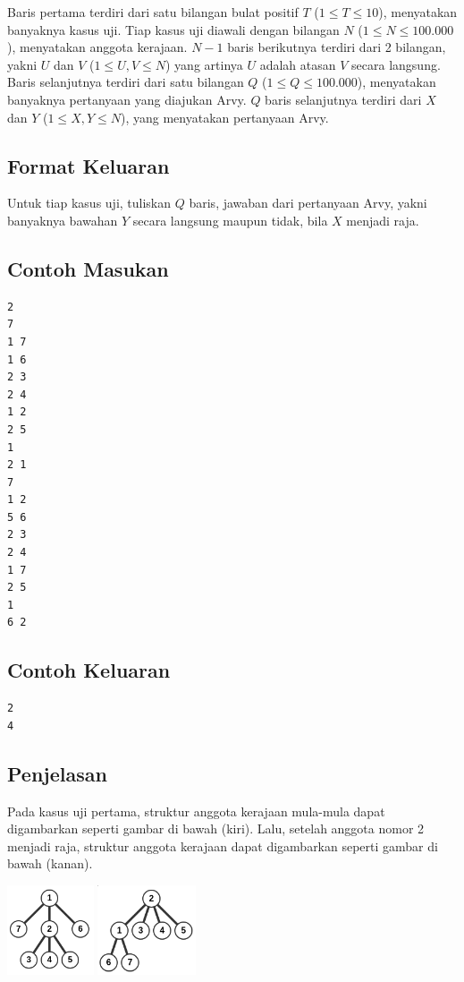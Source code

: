 \documentclass{article}
\begin{document}
Baris pertama terdiri dari satu bilangan bulat positif $T$ ($1 \leq T \leq 10$), menyatakan banyaknya kasus uji.
Tiap kasus uji diawali dengan bilangan $N$ ($1 \leq N \leq 100.000$), menyatakan anggota kerajaan.
$N - 1$ baris berikutnya terdiri dari 2 bilangan, yakni $U$ dan $V$ ($1 \leq U, V \leq N$) yang artinya $U$ adalah atasan $V$ secara langsung.
Baris selanjutnya terdiri dari satu bilangan $Q$ ($1 \leq Q \leq 100.000$), menyatakan banyaknya pertanyaan yang diajukan Arvy.
$Q$ baris selanjutnya terdiri dari $X$ dan $Y$ ($1 \leq X, Y \leq N$), yang menyatakan pertanyaan Arvy.

\subsection*{Format Keluaran}

Untuk tiap kasus uji, tuliskan $Q$ baris, jawaban dari pertanyaan Arvy, yakni banyaknya bawahan $Y$ secara langsung maupun tidak, bila $X$ menjadi raja.

\pagebreak

\begin{multicols}{2}
\subsection*{Contoh Masukan}
\begin{lstlisting}
2
7
1 7
1 6
2 3
2 4
1 2
2 5
1
2 1
7
1 2
5 6
2 3
2 4
1 7
2 5
1
6 2
\end{lstlisting}
\columnbreak
\subsection*{Contoh Keluaran}
\begin{lstlisting}
2
4
\end{lstlisting}
\vfill
\null
\end{multicols}

\subsection*{Penjelasan}
Pada kasus uji pertama, struktur anggota kerajaan mula-mula dapat digambarkan seperti gambar di bawah (kiri). Lalu, setelah anggota nomor 2 menjadi raja, struktur anggota kerajaan dapat digambarkan seperti gambar di bawah (kanan).

\includegraphics[height=100px]{sample-1-1}
\includegraphics[height=100px]{sample-1-2}
\end{document}
